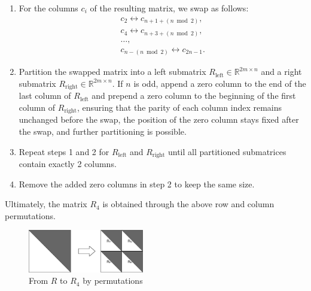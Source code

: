 \documentclass[conference]{IEEEtran}
\numberwithin{equation}{section}
\begin{document}
\begin{enumerate}
\item For the columns \( c_i \) of the resulting matrix, we swap as follows:  
   \begin{equation} \label{eq:cswap}
    \begin{aligned}
        &c_2 \leftrightarrow c_{n + 1 + (n \bmod 2)}, \quad \\
        &c_4 \leftrightarrow c_{n + 3 + (n \bmod 2)}, \quad \\
        &\dots, \quad \\
        &c_{n - (n \bmod 2)} \leftrightarrow c_{2n - 1}.
    \end{aligned}
   \end{equation}  
\item  Partition the swapped matrix into a left submatrix \( R_{\text{left}} \in \mathbb{R}^{2m \times n} \)  and a right submatrix \( R_{\text{right}} \in \mathbb{R}^{2m \times n} \). If \( n \) is odd, append a zero column to the end of the last column of \( R_{\text{left}} \) and prepend a zero column to the beginning of the first column of \( R_{\text{right}} \), ensuring that the parity of each column index remains unchanged before the swap, the position of the zero column stays fixed after the swap, and further partitioning is possible.  
 
\item  Repeat steps 1 and 2 for \( R_{\text{left}} \) and \( R_{\text{right}} \) until all partitioned submatrices contain exactly 2 columns. 
 
\item Remove the added zero columns in step 2 to keep the same size.
\end{enumerate}


 Ultimately, the matrix \( R_4 \) is obtained through the above row and column permutations.

\begin{figure}[htbp]
        \centering
        \includegraphics[width=0.45\textwidth,keepaspectratio=true]{images/Figure_1.png} %
        \caption{From $R$ to $R_4$ by permutations }
        \label{fig:Figure_1}
\end{figure}
\end{document}
